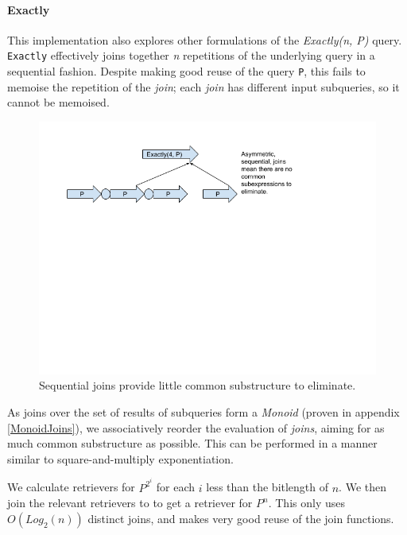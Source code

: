 \documentclass[12pt,a4paper,twoside,openright]{report}
\newcommand\codeName[1]{\texttt{#1}}
\newcommand\mathName[1]{\textit{#1}}
\let\oldparagraph\paragraph
\renewcommand{\paragraph}[1]{\oldparagraph{#1}\mbox{}}
\begin{document}
		\paragraph{Exactly}
		This implementation also explores other formulations of the \mathName{Exactly(n, P)} query. \codeName{Exactly} effectively joins together \mathName{n} repetitions of the underlying query in a sequential fashion. Despite making good reuse of the query \codeName{P}, this fails to memoise the repetition of the \mathName{join}; each \mathName{join} has different input subqueries, so it cannot be memoised.
		

\begin{figure}[ht]
\centering
  \includegraphics[width=\textwidth]{figs/SequentialJoins.png}
  \caption{Sequential joins provide little common substructure to eliminate.}
  \label{fig:SequentialJoins}
\end{figure}
		
		
		As joins over the set of results of subqueries form a \mathName{Monoid} (proven in appendix \ref{MonoidJoins}), we associatively reorder the evaluation of \mathName{joins}, aiming for as much common substructure as possible. This can be performed in a manner similar to square-and-multiply exponentiation.

We calculate retrievers for $P^{2^i}$ for each $i$ less than the bitlength of $n$. We then join the relevant retrievers to to get a retriever for $P^n$. This only uses $O(Log_2(n))$ distinct joins, and makes very good reuse of the join functions. 
\end{document}
